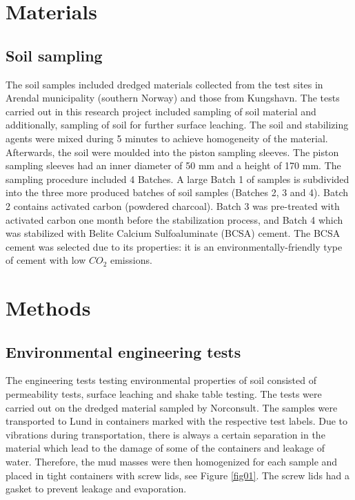 \documentclass[algorithms,article,submit,pdftex,moreauthors]{Definitions/mdpi}
\begin{document}
\section{Materials}

\subsection{Soil sampling}

The soil samples included dredged materials collected from the test sites in Arendal municipality (southern Norway) and those from Kungshavn. The tests carried out in this research project included sampling of soil material and additionally, sampling of soil for further surface leaching. The soil and stabilizing agents were mixed during 5 minutes to achieve homogeneity of the material. Afterwards, the soil were moulded into the piston sampling sleeves. The piston sampling sleeves had an inner diameter of 50 mm and a height of 170 mm. The sampling procedure included 4 Batches. A large Batch 1 of samples is subdivided into the three more produced batches of soil samples (Batches 2, 3 and 4). Batch 2 contains activated carbon (powdered charcoal). Batch 3 was pre-treated with activated carbon one month before the stabilization process, and Batch 4 which was stabilized with Belite Calcium Sulfoaluminate (BCSA) cement. The BCSA cement was selected due to its properties: it is an environmentally-friendly type of cement with low $CO_2$ emissions.

\section{Methods}

\subsection{Environmental engineering tests}

The engineering tests testing environmental properties of soil consisted of permeability tests, surface leaching and shake table testing. The tests were carried out on the dredged material sampled by Norconsult. The samples were transported to Lund in containers marked with the respective test labels. Due to vibrations during transportation, there is always a certain separation in the material which lead to the damage of some of the containers and leakage of water. Therefore, the mud masses were then homogenized for each sample and placed in tight containers with screw lids, see Figure \ref{fig01}. The screw lids had a gasket to prevent leakage and evaporation.
\end{document}
